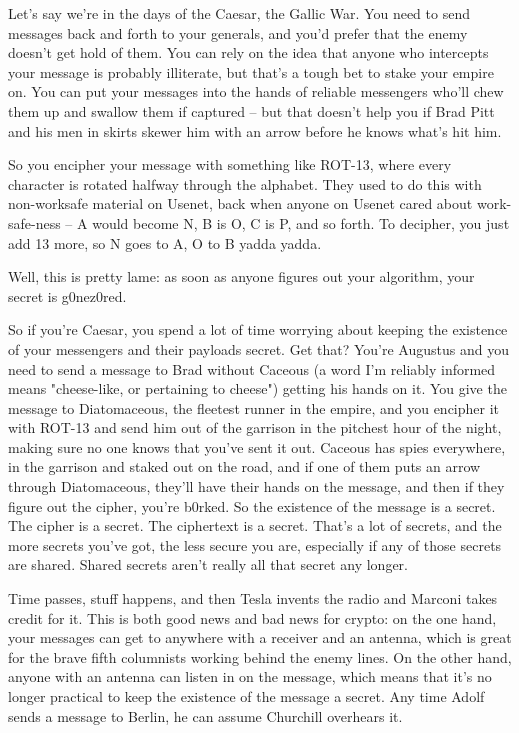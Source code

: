 Let's say we're in the days of the Caesar, the Gallic War. You need
to send messages back and forth to your generals, and you'd prefer
that the enemy doesn't get hold of them. You can rely on the idea
that anyone who intercepts your message is probably illiterate, but
that's a tough bet to stake your empire on. You can put your
messages into the hands of reliable messengers who'll chew them up
and swallow them if captured -- but that doesn't help you if Brad
Pitt and his men in skirts skewer him with an arrow before he knows
what's hit him.

So you encipher your message with something like ROT-13, where
every character is rotated halfway through the alphabet. They used
to do this with non-worksafe material on Usenet, back when anyone
on Usenet cared about work-safe-ness -- A would become N, B is O, C
is P, and so forth. To decipher, you just add 13 more, so N goes to
A, O to B yadda yadda.

Well, this is pretty lame: as soon as anyone figures out your
algorithm, your secret is g0nez0red.

So if you're Caesar, you spend a lot of time worrying about keeping
the existence of your messengers and their payloads secret. Get
that? You're Augustus and you need to send a message to Brad
without Caceous (a word I'm reliably informed means "cheese-like,
or pertaining to cheese") getting his hands on it. You give the
message to Diatomaceous, the fleetest runner in the empire, and you
encipher it with ROT-13 and send him out of the garrison in the
pitchest hour of the night, making sure no one knows that you've
sent it out. Caceous has spies everywhere, in the garrison and
staked out on the road, and if one of them puts an arrow through
Diatomaceous, they'll have their hands on the message, and then if
they figure out the cipher, you're b0rked. So the existence of the
message is a secret. The cipher is a secret. The ciphertext is a
secret. That's a lot of secrets, and the more secrets you've got,
the less secure you are, especially if any of those secrets are
shared. Shared secrets aren't really all that secret any longer.

Time passes, stuff happens, and then Tesla invents the radio and
Marconi takes credit for it. This is both good news and bad news
for crypto: on the one hand, your messages can get to anywhere with
a receiver and an antenna, which is great for the brave fifth
columnists working behind the enemy lines. On the other hand,
anyone with an antenna can listen in on the message, which means
that it's no longer practical to keep the existence of the message
a secret. Any time Adolf sends a message to Berlin, he can assume
Churchill overhears it.

